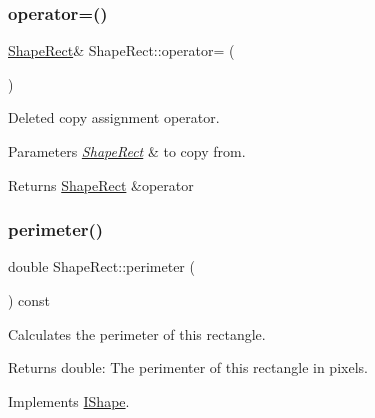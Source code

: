 \mbox{\label{class_shape_rect_aa5fd1e13562412ebceb977be0a455b18}} 
\subsubsection{\texorpdfstring{operator=()}{operator=()}}
{\footnotesize\ttfamily \mbox{\hyperlink{class_shape_rect}{Shape\+Rect}}\& Shape\+Rect\+::operator= (\begin{DoxyParamCaption}\item[{const \mbox{\hyperlink{class_shape_rect}{Shape\+Rect}} \&}]{ }\end{DoxyParamCaption})\hspace{0.3cm}{\ttfamily [delete]}}



Deleted copy assignment operator. 


\begin{DoxyParams}{Parameters}
{\em \mbox{\hyperlink{class_shape_rect}{Shape\+Rect}}} & to copy from. \\
\hline
\end{DoxyParams}
\begin{DoxyReturn}{Returns}
\mbox{\hyperlink{class_shape_rect}{Shape\+Rect}} \&operator 
\end{DoxyReturn}
\mbox{\label{class_shape_rect_a7dba46671dfd64188b37bff161d3bb89}} 
\subsubsection{\texorpdfstring{perimeter()}{perimeter()}}
{\footnotesize\ttfamily double Shape\+Rect\+::perimeter (\begin{DoxyParamCaption}{ }\end{DoxyParamCaption}) const\hspace{0.3cm}{\ttfamily [virtual]}}



Calculates the perimeter of this rectangle. 

\begin{DoxyReturn}{Returns}
double\+: The perimenter of this rectangle in pixels. 
\end{DoxyReturn}


Implements \mbox{\hyperlink{class_i_shape_a485f6770c4e56b31c76d368b959b6f00}{I\+Shape}}.



